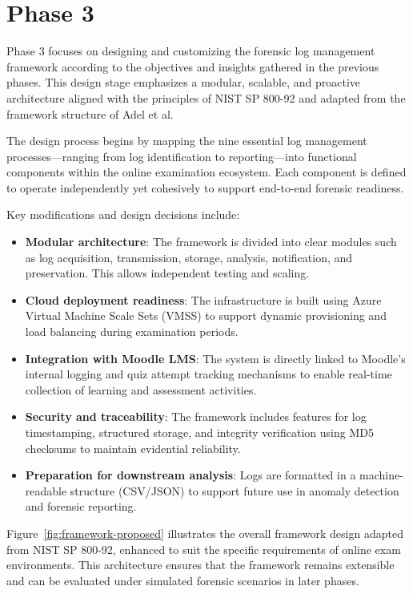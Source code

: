\section{Phase 3}
Phase 3 focuses on designing and customizing the forensic log management framework according to the objectives and insights gathered in the previous phases. This design stage emphasizes a modular, scalable, and proactive architecture aligned with the principles of NIST SP 800-92 and adapted from the framework structure of Adel et al.

The design process begins by mapping the nine essential log management processes—ranging from log identification to reporting—into functional components within the online examination ecosystem. Each component is defined to operate independently yet cohesively to support end-to-end forensic readiness.

Key modifications and design decisions include:

\begin{itemize}
	\item \textbf{Modular architecture}: The framework is divided into clear modules such as log acquisition, transmission, storage, analysis, notification, and preservation. This allows independent testing and scaling.
	
	\item \textbf{Cloud deployment readiness}: The infrastructure is built using Azure Virtual Machine Scale Sets (VMSS) to support dynamic provisioning and load balancing during examination periods.
	
	\item \textbf{Integration with Moodle LMS}: The system is directly linked to Moodle’s internal logging and quiz attempt tracking mechanisms to enable real-time collection of learning and assessment activities.
	
	\item \textbf{Security and traceability}: The framework includes features for log timestamping, structured storage, and integrity verification using MD5 checksums to maintain evidential reliability.
	
	\item \textbf{Preparation for downstream analysis}: Logs are formatted in a machine-readable structure (CSV/JSON) to support future use in anomaly detection and forensic reporting.
\end{itemize}

Figure~\ref{fig:framework-proposed} illustrates the overall framework design adapted from NIST SP 800-92, enhanced to suit the specific requirements of online exam environments. This architecture ensures that the framework remains extensible and can be evaluated under simulated forensic scenarios in later phases.

